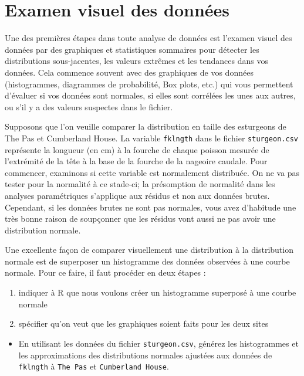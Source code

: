 \documentclass[12pt,]{book}
\providecommand{\tightlist}{%
  \setlength{\itemsep}{0pt}\setlength{\parskip}{0pt}}
\begin{document}
\hypertarget{examen-visuel-des-donnuxe9es}{%
\section{Examen visuel des données}\label{examen-visuel-des-donnuxe9es}}

Une des premières étapes dans toute analyse de données est l'examen visuel des données par des graphiques et statistiques sommaires pour détecter les distributions sous-jacentes, les valeurs extrêmes et les tendances dans vos données. Cela commence souvent avec des graphiques de vos données (histogrammes, diagrammes de probabilité, Box plots, etc.) qui vous permettent d'évaluer si vos données sont normales, si elles sont corrélées les unes aux autres, ou s'il y a des valeurs suspectes dans le fichier.

Supposons que l'on veuille comparer la distribution en taille des esturgeons de The Pas et Cumberland House. La variable \texttt{fklngth} dans le fichier \texttt{sturgeon.csv} représente la longueur (en cm) à la fourche de chaque poisson mesurée de l'extrémité de la tête à la base de la fourche de la nageoire caudale. Pour commencer, examinons si cette variable est normalement distribuée. On ne va pas tester pour la normalité à ce stade-ci; la présomption de normalité dans les analyses paramétriques s'applique aux résidus et non aux données brutes. Cependant, si les données brutes ne sont pas normales, vous avez d'habitude une très bonne raison de soupçonner que les résidus vont aussi ne pas avoir une distribution normale.

Une excellente façon de comparer visuellement une distribution à la distribution normale est de superposer un histogramme des données observées à une courbe normale. Pour ce faire, il faut procéder en deux étapes :

\begin{enumerate}
\def\labelenumi{\arabic{enumi}.}
\tightlist
\item
  indiquer à R que nous voulons créer un histogramme superposé à une courbe normale
\item
  spécifier qu'on veut que les graphiques soient faits pour les deux sites
\end{enumerate}

\begin{itemize}
\tightlist
\item
  En utilisant les données du fichier \texttt{sturgeon.csv}, générez les histogrammes et les approximations des distributions normales ajustées aux données de \texttt{fklngth} à \texttt{The\ Pas} et \texttt{Cumberland\ House}.
\end{itemize}
\end{document}
